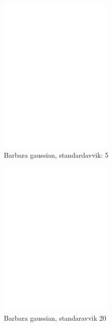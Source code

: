 \documentclass[a4paper, 12pt]{article}
\begin{document}
\begin{figure}[h]
  \centering
  \includegraphics[width=0.5\textwidth]{images/barbara-gaussian-5}
  \caption{Barbara gaussian, standardavvik: 5}
  \label{fig:barbara-gaussian-5}
\end{figure}

\begin{figure}[h]
  \centering
  \includegraphics[width=0.5\textwidth]{images/barbara-gaussian-20}
  \caption{Barbara gaussian, standaravvik 20}
  \label{fig:barbara-gaussian-20}
\end{figure}
\end{document}
